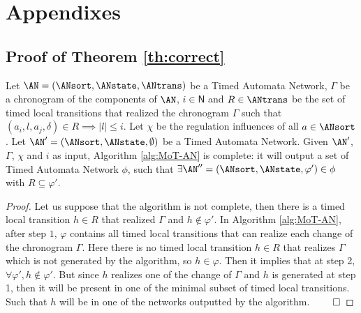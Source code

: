 \documentclass[runningheads,a4paper]{llncs}
\begin{document}
\section{Appendixes}

\subsection{Proof of Theorem \ref{th:correct}}

	\begin{theorem}[Completeness]%
		Let $\AN=(\ANsort,\ANstate,\ANtrans)$ be a Timed Automata Network, $\Gamma$ be a chronogram of the components of $\AN$, $i \in \mathsf{N}$ and $R \in \ANtrans$ be the set of timed local transitions that realized the chronogram $\Gamma$ such that $(a_i,l,a_j,\delta) \in R \implies |l| \leq i$.
    	Let $\chi$ be the regulation influences of all $a \in \ANsort$.
		Let $\AN'=(\ANsort,\ANstate,\emptyset)$ be a Timed Automata Network.
		Given $\AN'$, $\Gamma$, $\chi$ and $i$ as input, Algorithm \ref{alg:MoT-AN} is complete:
		it will output a set of Timed Automata Network $\phi$,
		such that $\exists \AN''=(\ANsort,\ANstate,\varphi') \in \phi$ with $R \subseteq \varphi'$.

		\begin{proof}
		Let us suppose that the algorithm is not complete, then there is a timed local transition $h \in R$ that realized $\Gamma$ and $h \not \in \varphi'$.
		In Algorithm \ref{alg:MoT-AN}, after step $1$, $\varphi$ contains all timed local transitions that can realize each change of the chronogram $\Gamma$.
		Here there is no timed local transition $h \in R$ that realizes $\Gamma$ which is not generated by the algorithm, so $h \in \varphi$.
		Then it implies that at step 2, $\forall \varphi', h \not \in \varphi'$.
		But since $h$ realizes one of the change of $\Gamma$ and $h$ is generated at step 1, then it will be present in one of the minimal subset of timed local transitions.
		Such that $h$ will be in one of the networks outputted by the algorithm.
		$\qed$
		\end{proof}
	\end{theorem}
    
\end{document}
